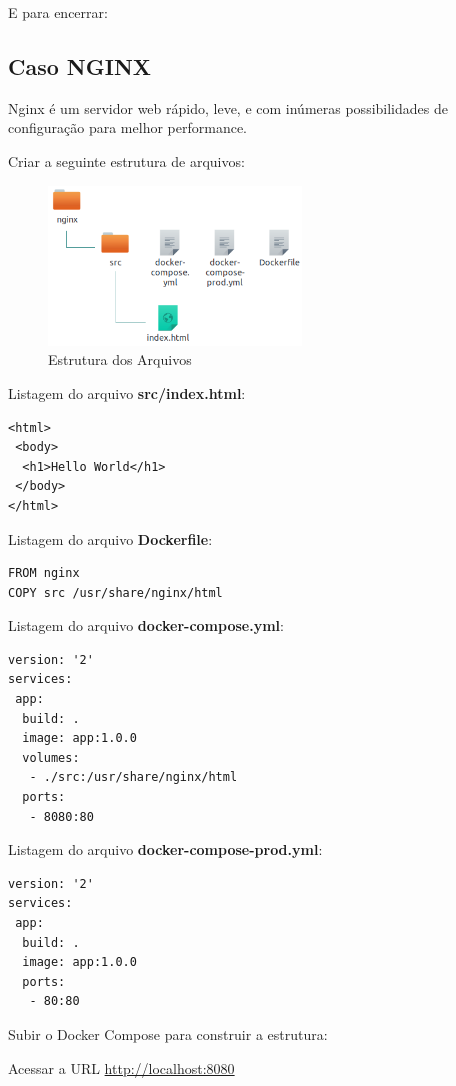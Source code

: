 \documentclass[a4paper,11pt]{article}
\begin{document}
E para encerrar: \\

\subsection{Caso NGINX}
Nginx é um servidor web rápido, leve, e com inúmeras possibilidades de configuração para melhor performance. 

Criar a seguinte estrutura de arquivos:
\begin{figure}[!htb]
	\centering
	\includegraphics[width=0.6\textwidth]{imagem/estnginx.png}
	\caption{Estrutura dos Arquivos}
\end{figure}

Listagem do arquivo \textbf{src/index.html}:
\begin{lstlisting}[]
<html>
 <body>
  <h1>Hello World</h1>
 </body>
</html>
\end{lstlisting}

Listagem do arquivo \textbf{Dockerfile}:
\begin{lstlisting}[]
FROM nginx
COPY src /usr/share/nginx/html
\end{lstlisting}

Listagem do arquivo \textbf{docker-compose.yml}:
\begin{lstlisting}[]
version: '2'
services:
 app:
  build: .
  image: app:1.0.0
  volumes:
   - ./src:/usr/share/nginx/html
  ports:
   - 8080:80 
\end{lstlisting}

Listagem do arquivo \textbf{docker-compose-prod.yml}:
\begin{lstlisting}[]
version: '2'
services:
 app:
  build: .
  image: app:1.0.0
  ports:
   - 80:80 
\end{lstlisting}

Subir o Docker Compose para construir a estrutura: \\

Acessar a URL \url{http://localhost:8080}
\end{document}
